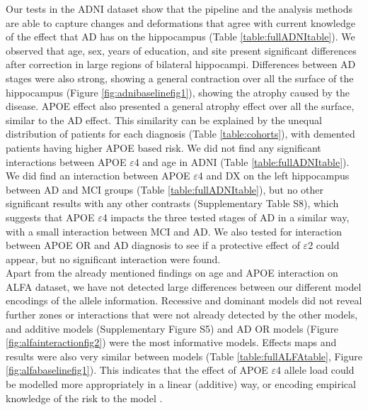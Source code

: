 Our tests in the ADNI dataset show that the pipeline and the analysis methods are able to capture changes and deformations that agree with current knowledge of the effect that AD has on the hippocampus (Table \ref{table:fullADNItable}). We observed that age, sex, years of education, and site present significant differences after correction in large regions of bilateral hippocampi. Differences between AD stages were also strong, showing a general contraction over all the surface of the hippocampus (Figure \ref{fig:adnibaselinefig1}), showing the atrophy caused by the disease. APOE effect also presented a general atrophy effect over all the surface, similar to the AD effect. This similarity can be explained by the unequal distribution of patients for each diagnosis (Table \ref{table:cohorts}), with demented patients having higher APOE based risk. We did not find any significant interactions between APOE $\varepsilon$4 and age in ADNI (Table \ref{table:fullADNItable}). We did find an interaction between APOE $\varepsilon$4 and DX on the left hippocampus between AD and MCI groups (Table \ref{table:fullADNItable}), but no other significant results with any other contrasts (Supplementary Table S8), which suggests that APOE $\varepsilon$4 impacts the three tested stages of AD in a similar way, with a small interaction between MCI and AD. We also tested for interaction between APOE OR and AD diagnosis to see if a protective effect of $\varepsilon$2 could appear, but no significant interaction were found. \\

Apart from the already mentioned findings on age and APOE interaction on ALFA dataset, we have not detected large differences between our different model encodings of the allele information. Recessive and dominant models did not reveal further zones or interactions that were not already detected by the other models, and additive models (Supplementary Figure S5) and AD OR models (Figure \ref{fig:alfainteractionfig2}) were the most informative models. Effects maps and results were also very similar between models (Table \ref{table:fullALFAtable}, Figure \ref{fig:alfabaselinefig1}). This indicates that the effect of APOE $\varepsilon$4 allele load could be modelled more appropriately in a linear (additive) way, or encoding empirical knowledge of the risk to the model \cite{Reiman2020}. \\

